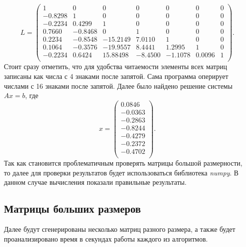 \documentclass[a4paper, 12pt]{article}   	%
\begin{document}
\begin{equation*}
    L = 
    \left(\begin{array}{ccccccc} 
    1 &  0 &  0 &  0 &  0 &  0 &  0 \\
    -0.8298 &  1 &  0 &  0 &  0 &  0 &  0 \\
    -0.2234 &  0.4299 &  1 &  0 &  0 &  0 &  0 \\
    0.7660 &  -0.8468 &  0 &  1 &  0 &  0 &  0 \\
    0.2234 &  -0.8548 &  -15.2149 &  7.0110 &  1 &  0 &  0 \\
    0.1064 &  -0.3576 &  -19.9557 &  8.4441 &  1.2995 &  1 &  0 \\
    -0.2234 &  0.6424 &  15.88498 &  -8.4500 &  -1.1078 &  0.0096 &  1 \\
    \end{array}\right).
\end{equation*}
Стоит сразу отметить, что для удобства читаемости элементы всех матриц записаны как числа с 4 знаками после запятой. Сама программа оперирует числами с 16 знаками после запятой. Далее было найдено решение системы $Ax=b$, где 
\begin{equation*}
    x = 
    \left(\begin{array}{c}
    0.0846 \\
    -0.0363 \\
    -0.2863 \\
    -0.8244 \\
    -0.4279 \\
    -0.2372 \\
    -0.4702 \\
     \end{array}\right).
\end{equation*}
Так как становится проблематичным проверять матрицы большой размерности, то далее для проверки результатов будет использоваться библиотека {\it numpy}. В данном случае вычисления показали правильные результаты.



\subsection{Матрицы больших размеров}
Далее будут сгенерированы несколько матриц разного размера, а также будет проанализировано время в секундах работы каждого из алгоритмов.
\\\\
\\\\
\end{document}
